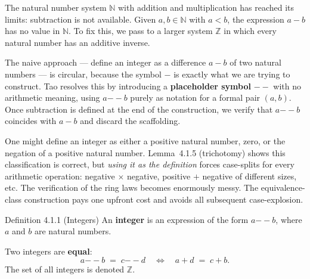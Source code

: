 
\begin{remark*}
The natural number system $\mathbb{N}$ with addition and multiplication
has reached its limits: subtraction is not available.
Given $a, b \in \mathbb{N}$ with $a < b$, the expression $a - b$ has
no value in $\mathbb{N}$. To fix this, we pass to a larger system $\mathbb{Z}$
in which every natural number has an additive inverse.
\end{remark*}

\begin{remark*}
The naive approach --- define an integer as a difference $a - b$ of two
natural numbers --- is circular, because the symbol $-$ is exactly what we
are trying to construct.
Tao resolves this by introducing a \textbf{placeholder symbol} $--$
with no arithmetic meaning, using $a {-\!\!-} b$ purely as notation for a
formal pair $(a, b)$.
Once subtraction is defined at the end of the construction, we verify that
$a {-\!\!-} b$ coincides with $a - b$ and discard the scaffolding.
\end{remark*}

\begin{remark*}
One might define an integer as either a positive natural number, zero,
or the negation of a positive natural number.
Lemma~4.1.5 (trichotomy) shows this classification is correct, but
\emph{using it as the definition} forces case-splits for every arithmetic
operation: negative $\times$ negative, positive $+$ negative of different
sizes, etc. The verification of the ring laws becomes enormously messy.
The equivalence-class construction pays one upfront cost and avoids
all subsequent case-explosion.
\end{remark*}

\begin{propositionbox}{Definition 4.1.1 (Integers)}
An \textbf{integer} is an expression of the form $a {-\!\!-} b$, where
$a$ and $b$ are natural numbers.

Two integers are \textbf{equal}:
\[
a {-\!\!-} b \;=\; c {-\!\!-} d
\quad\iff\quad
a + d \;=\; c + b.
\]
The set of all integers is denoted $\mathbb{Z}$.
\end{propositionbox}

